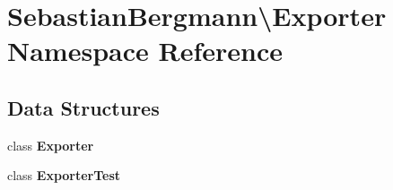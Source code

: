 \section{Sebastian\+Bergmann\textbackslash{}Exporter Namespace Reference}
\label{namespace_sebastian_bergmann_1_1_exporter}
\subsection*{Data Structures}
\begin{DoxyCompactItemize}
\item 
class {\bf Exporter}
\item 
class {\bf Exporter\+Test}
\end{DoxyCompactItemize}
